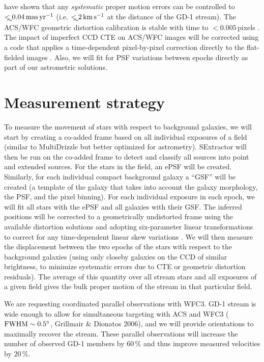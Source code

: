 \documentclass[12pt]{article}
\begin{document}
\textcite{sohn2012, sohn2013} have shown that any \emph{systematic} proper motion errors can be controlled to $\lesssim0.04\,\rm mas\,yr^{-1}$ (i.e. $\lesssim2\,\rm km\,s^{-1}$ at the distance of the GD-1 stream).
The ACS/WFC geometric distortion calibration is stable with time to $<0.005$\,pixels \parencite{anderson2007}.
The impact of imperfect CCD CTE on ACS/WFC images will be corrected using a code that applies a time-dependent pixel-by-pixel correction directly to the flat-fielded images \parencite{andersonbedin2010}.
Also, we will fit for PSF variations between epochs directly as part of our astrometric solutions.

\section*{Measurement strategy}
To measure the movement of stars with respect to background galaxies, we will start by creating a co-added frame based on all individual exposures of a field (similar to MultiDrizzle but better optimized for astrometry).
SExtractor will then be run on the co-added frame to detect and classify all sources into point and extended sources.
For the stars in the field, an ePSF \parencite[effective Point Spread Function;][]{anderson2003} will be created.
Similarly, for each individual compact background galaxy a ``GSF'' will be created (a template of the galaxy that takes into account the galaxy morphology, the PSF, and the pixel binning).
For each individual exposure in each epoch, we will fit all stars with the ePSF and all galaxies with their GSF.
The inferred positions will be corrected to a geometrically undistorted frame using the available distortion solutions \parencite{anderson2004} and adopting six-parameter linear transformations to correct for any time-dependent linear skew variations \parencite{anderson2007}.
We will then measure the displacement between the two epochs of the stars with respect to the background galaxies (using only closeby galaxies on the CCD of similar brightness, to minimize systematic errors due to CTE or geometric distortion residuals).
The average of this quantity over all stream stars and all exposures of a given field gives the bulk proper motion of the stream in that particular field.


\printbibliography[heading=none]



%
%
\specialreq             %
We are requesting coordinated parallel observations with WFC3.
GD-1 stream is wide enough to allow for simultaneous targeting with ACS and WFC3 ($\rm FWHM\sim0.5^\circ$, Grillmair \& Dionatos 2006), and we will provide orientations to maximally recover the stream.
These parallel observations will increase the number of observed GD-1 members by 60\,\% and thus improve measured velocities by 20\,\%.
\end{document}
